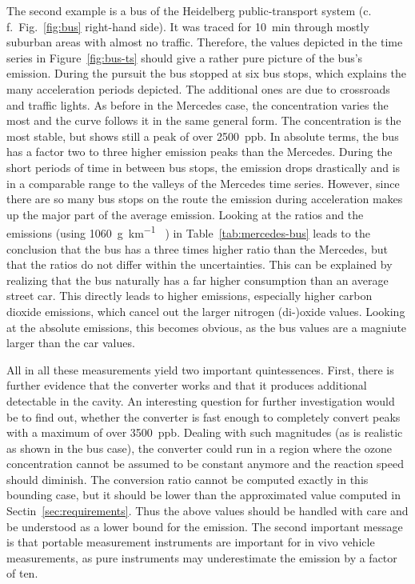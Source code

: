 The second example is a bus of the Heidelberg public-transport system
(c.\,f.\ Fig.~\ref{fig:bus} right-hand side). It was traced for
\SI{10}{\minute} through mostly suburban areas with almost no
traffic. Therefore, the values depicted in the time series in
Figure~\ref{fig:bus-ts} should give a rather pure picture of the bus's
emission. During the pursuit the bus stopped at six bus stops, which
explains the many acceleration periods depicted. The additional ones
are due to crossroads and traffic lights. As before in the Mercedes
case, the  concentration varies the most and the 
curve follows it in the same general form. The  concentration
is the most stable, but shows still a peak of over \SI{2500}{ppb}. In
absolute terms, the bus has a factor two to three higher 
emission peaks than the Mercedes. During the short periods of time in
between bus stops, the emission drops drastically and is in a
comparable range to the valleys of the Mercedes time series. However,
since there are so many bus stops on the route the emission during
acceleration makes up the major part of the average emission. Looking
at the ratios and the emissions (using \SI{1060}{\gram\per\kilo\meter}
~\cite{denis}) in Table~\ref{tab:mercedes-bus} leads to the
conclusion that the bus has a three times higher  ratio than
the Mercedes, but that the  ratios do not differ within the
uncertainties. This can be explained by realizing that the bus
naturally has a far higher consumption than an average street
car. This directly leads to higher emissions, especially higher carbon
dioxide emissions, which cancel out the larger nitrogen (di-)oxide
values. Looking at the absolute emissions, this becomes obvious, as
the bus values are a magniute larger than the car values.

All in all these measurements yield two important
quintessences. First, there is further evidence that the converter
works and that it produces additional detectable  in the
cavity. An interesting question for further investigation would be to
find out, whether the converter is fast enough to completely convert
 peaks with a maximum of over \SI{3500}{ppb}. Dealing with
such magnitudes (as is realistic as shown in the bus case), the
converter could run in a region where the ozone concentration cannot
be assumed to be constant anymore and the reaction speed should
diminish. The conversion ratio cannot be computed exactly in this
bounding case, but it should be lower than the approximated value
computed in Sectin~\ref{sec:requirements}. Thus the above 
values should be handled with care and be understood as a lower bound
for the emission. The second important message is that portable
 measurement instruments are important for in vivo vehicle
measurements, as pure  instruments may underestimate the
 emission by a factor of ten.

